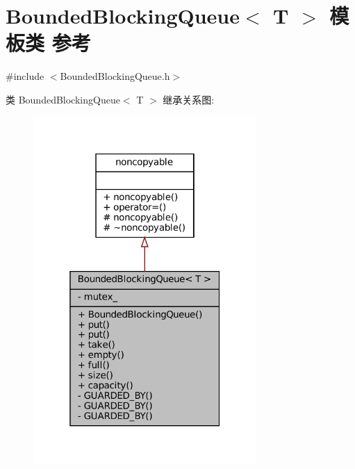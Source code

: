 \hypertarget{classmuduo_1_1BoundedBlockingQueue}{}\section{Bounded\+Blocking\+Queue$<$ T $>$ 模板类 参考}
\label{classmuduo_1_1BoundedBlockingQueue}


{\ttfamily \#include $<$Bounded\+Blocking\+Queue.\+h$>$}



类 Bounded\+Blocking\+Queue$<$ T $>$ 继承关系图\+:
\nopagebreak
\begin{figure}[H]
\begin{center}
\leavevmode
\includegraphics[width=241pt]{classmuduo_1_1BoundedBlockingQueue__inherit__graph}
\end{center}
\end{figure}


